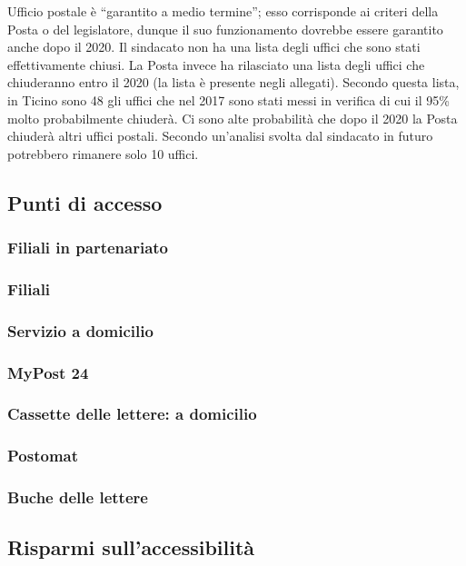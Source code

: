 Ufficio postale è “garantito a medio 
termine”; esso corrisponde ai 
criteri della Posta o del legislatore,
dunque il suo funzionamento
dovrebbe essere garantito anche 
dopo il 2020.
Il sindacato non ha una lista degli uffici che sono stati effettivamente chiusi. La Posta invece ha rilasciato una lista degli uffici che chiuderanno entro il 2020 (la lista è presente negli allegati). Secondo questa lista, in Ticino sono 48 gli uffici che nel 2017 sono stati messi in verifica di cui il 95\% molto probabilmente chiuderà. Ci sono alte probabilità che dopo il 2020 la Posta chiuderà altri uffici postali. Secondo un’analisi svolta dal sindacato in futuro potrebbero rimanere solo 10 uffici.

\subsection{Punti di accesso}

\subsubsection{Filiali in partenariato}
\subsubsection{Filiali}
\subsubsection{Servizio a domicilio}
\subsubsection{MyPost 24}
\subsubsection{Cassette delle lettere: a domicilio}
\subsubsection{Postomat}
\subsubsection{Buche delle lettere}

\subsection{Risparmi sull'accessibilità}

